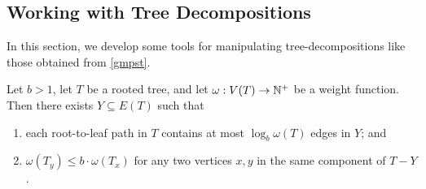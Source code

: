 \documentclass{patmorin}
\renewcommand{\le}{\leqslant}
\newcommand{\calG}{\mathcal{G}}
\begin{document}
\subsection{Working with Tree Decompositions}
\label{working_with_tree_decomps}






In this section, we develop some tools for manipulating tree-decompositions like those obtained from \cref{gmpst}.


\begin{lem}\label{skinny_edges}
  Let $b>1$, let $T$ be a rooted tree, and let $\omega:V(T)\to\mathbb{N}^+$ be a weight function.  Then there exists $Y\subseteq E(T)$ such that
  \begin{enumerate}[nosep,nolistsep,label=\rm(\alph*)] 
    \item each root-to-leaf path in $T$ contains at most $\log_b \omega(T)$ edges in $Y$; and
    \item $\omega(T_y)\le b\cdot\omega(T_x)$ for any two vertices $x,y$ in the same component of $T-Y$.
  \end{enumerate}
\end{lem}
\end{document}
